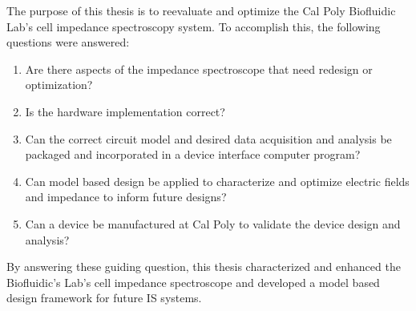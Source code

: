 \par The purpose of this thesis is to reevaluate and optimize the Cal Poly Biofluidic Lab's cell impedance spectroscopy system. To accomplish this, the following questions were answered:
\begin{enumerate}
    \item Are there aspects of the impedance spectroscope that need redesign or optimization?
    \item Is the hardware implementation correct?
    \item Can the correct circuit model and desired data acquisition and analysis be packaged and incorporated in a device interface computer program?
    \item Can model based design be applied to characterize and optimize electric fields and impedance to inform future designs?
    \item Can a device be manufactured at Cal Poly to validate the device design and analysis?
\end{enumerate}

\noindent By answering these guiding question, this thesis characterized and enhanced the Biofluidic's Lab's cell impedance spectroscope and developed a model based design framework for future IS systems. 